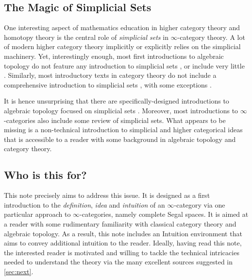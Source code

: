 \documentclass[11pt, a4paper]{amsart}
\theoremstyle{definition}
\theoremstyle{remark}
\numberwithin{equation}{section}
\begin{document}
\subsection{The Magic of Simplicial Sets} \label{subsec:magic of ss}
One interesting aspect of mathematics education in higher category theory and homotopy theory is the central role of \emph{simplicial sets} in $\infty$-category theory. A lot of modern higher category theory implicitly or explicitly relies on the simplicial machinery. Yet, interestingly enough, most first introductions to algebraic topology do not feature any introduction to simplicial sets \cite{rotman1988algebraictopology,massey1991basicalgebraictopology,munkreskrantzparks2025elementsofalgebraictopology,tomdieck2008algebraictopology}, or include very little \cite{hatcher2002at,may1999algebraictopology}. Similarly, most introductory texts in category theory do not include a comprehensive introduction to simplicial sets \cite{awodey2010categorytheory,leinster2014basiccategorytheory,riehl2016context}, with some exceptions \cite{maclane1998categories}.

It is hence unsurprising that there are specifically-designed introductions to algebraic topology focused on simplicial sets \cite{may1992simplicialobjects,goerssjardine2009simplicialhomotopytheory}. Moreover, most introductions to $\infty$-categories also include some review of simplicial sets. What appears to be missing is a non-technical introduction to simplicial and higher categorical ideas that is accessible to a reader with some background in algebraic topology and category theory.

\subsection{Who is this for?}
This note precisely aims to address this issue. It is designed as a first introduction to the \emph{definition}, \emph{idea} and \emph{intuition} of an $\infty$-category via one particular approach to $\infty$-categories, namely complete Segal spaces. It is aimed at a reader with some rudimentary familiarity with classical category theory and algebraic topology. As a result, this note includes an {\color{blue} Intuition} environment that aims to convey additional intuition to the reader. Ideally, having read this note, the interested reader is motivated and willing to tackle the technical intricacies needed to understand the theory via the many excellent sources suggested in \cref{sec:next}.
\end{document}
